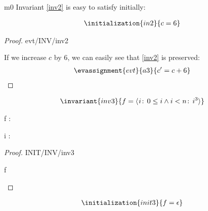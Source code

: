 \documentclass[12pt]{amsart}
\begin{document}
\begin{machine}{m0}
Invariant \ref{inv2} is easy to satisfy initially:

\begin{align*}
\initialization{in2}
{	c = 6	}
\end{align*}
%
\begin{proof}{evt/INV/inv2}

	If we increase $c$ by 6, we can easily see that \ref{inv2} is preserved:
\begin{align*}
\evassignment{evt}{a3}
{	c' = c + 6	}
\end{align*}

	\easy
\end{proof}

\begin{align*}
\invariant{inv3}
{	f = \qfun{i}{ 0 \le i \land i < n }{ i^3 } }
\end{align*}

\begin{variable}
	f : \Int \pfun \Int
\end{variable}

\begin{dummy}
	i : \Int
\end{dummy}

\begin{use:fun}{\Int}{\Int} \end{use:fun}

\begin{proof}{INIT/INV/inv3}
	\begin{calculation}
	\hint{=}{ \ref{init0} }
		\oftype{ \emptyfun }{ \pfun [ \Int, \Int ] }
	\hint{=}{ \ref{init3} }
		f
	\end{calculation}
\end{proof}

\begin{align*}
\initialization{init3}
{	f = \emptyfun	}
\end{align*}

\end{machine}
\end{document}
